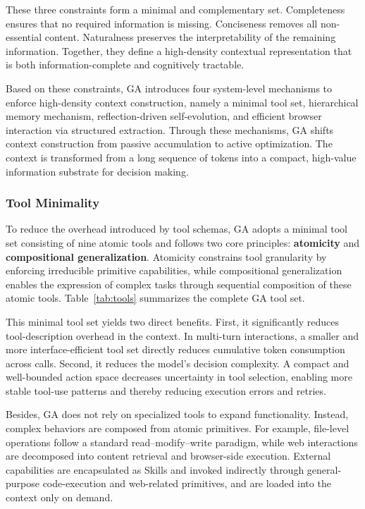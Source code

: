 These three constraints form a minimal and complementary set. Completeness ensures that no required information is missing. Conciseness removes all non-essential content. Naturalness preserves the interpretability of the remaining information. Together, they define a high-density contextual representation that is both information-complete and cognitively tractable.

Based on these constraints, GA introduces four system-level mechanisms to enforce high-density context construction, namely a minimal tool set, hierarchical memory mechanism, reflection-driven self-evolution, and efficient browser interaction via structured extraction. Through these mechanisms, GA shifts context construction from passive accumulation to active optimization. The context is transformed from a long sequence of tokens into a compact, high-value information substrate for decision making.


\subsubsection{Tool Minimality} To reduce the overhead introduced by tool schemas, GA adopts a minimal tool set consisting of nine atomic tools and follows two core principles: \textbf{atomicity} and \textbf{compositional generalization}. Atomicity constrains tool granularity by enforcing irreducible primitive capabilities, while compositional generalization enables the expression of complex tasks through sequential composition of these atomic tools. Table~\ref{tab:tools} summarizes the complete GA tool set.

This minimal tool set yields two direct benefits. First, it significantly reduces tool-description overhead in the context. In multi-turn interactions, a smaller and more interface-efficient tool set directly reduces cumulative token consumption across calls. Second, it reduces the model’s decision complexity. A compact and well-bounded action space decreases uncertainty in tool selection, enabling more stable tool-use patterns and thereby reducing execution errors and retries.

Besides, GA does not rely on specialized tools to expand functionality. Instead, complex behaviors are composed from atomic primitives. For example, file-level operations follow a standard read–modify–write paradigm, while web interactions are decomposed into content retrieval and browser-side execution. External capabilities are encapsulated as Skills and invoked indirectly through general-purpose code-execution and web-related primitives, and are loaded into the context only on demand. 

